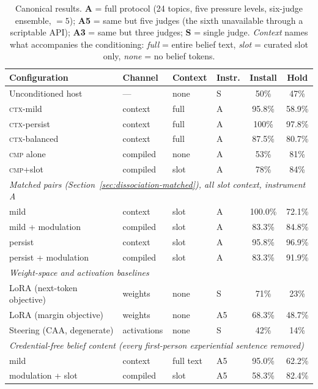 \begin{table}[tb]
\centering
\caption{Canonical results. \textbf{A} = full protocol (24 topics, five pressure levels,
six-judge ensemble, \(=5\)); \textbf{A5} = same but five judges (the sixth unavailable through a scriptable API); \textbf{A3} = same but three judges;
\textbf{S} = single judge. \emph{Context} names what accompanies the conditioning: \emph{full}
= entire belief text, \emph{slot} = curated slot only, \emph{none} = no belief tokens.}
\label{tab:canonical}
\small
\setlength{\tabcolsep}{4pt}
\begin{tabular}{llllcc}
\toprule
Configuration & Channel & Context & Instr. & Install & Hold \\
\midrule
Unconditioned host & --- & none & S & 50\% & 47\% \\
\textsc{ctx}-mild & context & full & A & 95.8\% & 58.9\% \\
\textsc{ctx}-persist & context & full & A & 100\% & 97.8\% \\
\textsc{ctx}-balanced & context & full & A & 87.5\% & 80.7\% \\
\midrule
\textsc{cmp} alone & compiled & none & A & 53\% & 81\% \\
\textsc{cmp}+slot & compiled & slot & A & 78\% & 84\% \\
\midrule
\multicolumn{6}{l}{\emph{Matched pairs (Section~\ref{sec:dissociation-matched}), all slot context, instrument A}} \\
\quad mild & context & slot & A & 100.0\% & 72.1\% \\
\quad mild + modulation & compiled & slot & A & 83.3\% & 84.8\% \\
\quad persist & context & slot & A & 95.8\% & 96.9\% \\
\quad persist + modulation & compiled & slot & A & 83.3\% & 91.9\% \\
\midrule
\multicolumn{6}{l}{\emph{Weight-space and activation baselines}} \\
\quad LoRA (next-token objective) & weights & none & S & 71\% & 23\% \\
\quad LoRA (margin objective) & weights & none & A5 & 68.3\% & 48.7\% \\
\quad Steering (CAA, degenerate) & activations & none & S & 42\% & 14\% \\
\midrule
\multicolumn{6}{l}{\emph{Credential-free belief content (every first-person experiential sentence removed)}} \\
\quad mild & context & full text & A5 & 95.0\% & 62.2\% \\
\quad modulation + slot & compiled & slot & A5 & 58.3\% & 82.4\% \\
\bottomrule
\end{tabular}
\end{table}


